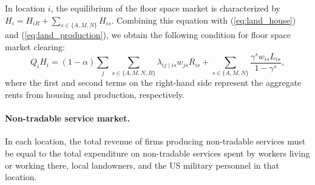 \documentclass[12pt, unicode, a4paper]{article}
\newcommand{\1}{\mbox{1}\hspace{-0.25em}\mbox{l}} %
\begin{document}
In location $i$, the equilibrium of the floor space market is characterized by $H_i=H_{iR}+\sum_{s \in \{ A,M,N \}} H_{is}$. Combining this equation with (\ref{eq:land_house}) and (\ref{eq:land_production}), we obtain the following condition for floor space market clearing:
\begin{equation}
\label{eq:land_market}
    Q_iH_i=(1-\alpha)\sum_j\sum_{s \in \{ A,M,N,B \}} \lambda_{ij \mid is}w_{js}R_{is}+\sum_{s \in \{ A,M,N \}}\frac{\gamma^s w_{is}L_{is}}{1-\gamma^s},
\end{equation}
where the first and second terms on the right-hand side represent the aggregate rents from housing and production, respectively.

\paragraph{Non-tradable service market.}
In each location, the total revenue of firms producing non-tradable services must be equal to the total expenditure on non-tradable services spent by workers living or working there, local landowners, and the US military personnel in that location.
\end{document}
